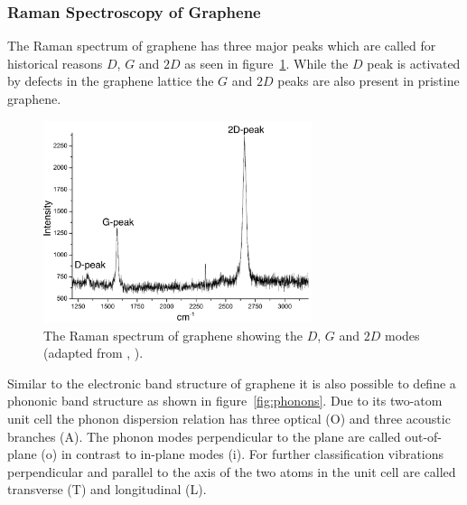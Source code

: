 \subsubsection{Raman Spectroscopy of Graphene}

The Raman spectrum of graphene has three major peaks which are called for historical reasons $D$, $G$ and $2D$ as seen in figure~\ref{fig:dispersion}. While the $D$ peak is activated by defects in the graphene lattice the $G$ and $2D$ peaks are also present in pristine graphene\mcite.

\begin{figure}[!h]
  \centering
  \includegraphics[width=0.7\textwidth]{./images/graphene-raman.png}
  \caption{The Raman spectrum of graphene showing the $D$, $G$ and $2D$ modes (adapted from \mcite, ).}
  \label{fig:dispersion}
\end{figure}

Similar to the electronic band structure of graphene it is also possible to define a phononic band structure as shown in figure~\ref{fig:phonons}. Due to its two-atom unit cell the phonon dispersion relation has three optical (O) and three acoustic branches (A). The phonon modes perpendicular to the plane are called out-of-plane (o) in contrast to in-plane modes (i). For further classification vibrations perpendicular and parallel to the axis of the two atoms in the unit cell are called transverse (T) and longitudinal (L).

